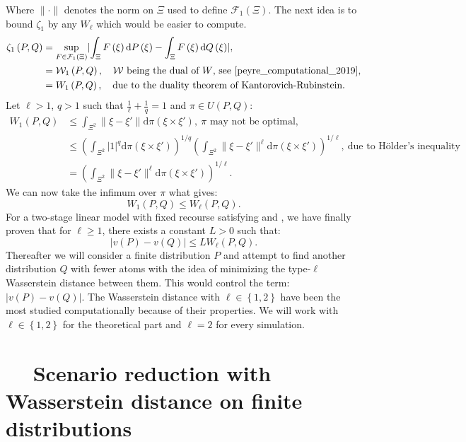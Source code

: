 \documentclass{amsart}
\begin{document}
Where $\lVert \cdot \rVert$ denotes the norm on $\Xi$ used to define $\mathcal{F}_1\left(\Xi\right)$. The next idea is to bound $\zeta_1$ by any $W_\ell$ which would be easier to compute.
\begin{align*}
    \zeta_1\left(P,Q\right)&= \sup_{F\in\mathcal{F}_1\left(\Xi\right)}\lvert \int_\Xi F\left(\xi\right)\text{d}P\left(\xi\right)-\int_\Xi F\left(\xi\right)\text{d}Q\left(\xi\right)\rvert, \\
    &=\mathcal{W}_1\left(P,Q\right), \quad \mathcal{W} \text{ being the dual of } W \text{, see \cite[Chapter 6]{peyre_computational_2019},}\\
    &= W_1\left(P,Q\right), \quad \text{due to the duality theorem of Kantorovich-Rubinstein.}
\end{align*}
Let $\ell >1$, $q>1$ such that $\frac{1}{\ell}+\frac{1}{q}=1$ and $\pi\in U\left(P,Q\right)$:
\begin{align*}
W_1\left(P,Q\right)&\leq \int_{\Xi^2}\lVert \xi-\xi'\rVert \text{d}\pi\left(\xi\times\xi'\right),\: \pi \text{ may not be optimal,} \\ &\leq \left(\int_{\Xi^2} \lvert 1\rvert^{q}\text{d}\pi\left(\xi\times\xi'\right)\right)^{1/q} \left(\int_{\Xi^2}\lVert \xi-\xi'\rVert^\ell\text{d}\pi\left(\xi\times\xi'\right)\right)^{1/\ell}, \: \text{due to Hölder's inequality} \\
&=\left(\int_{\Xi^2}\lVert \xi-\xi'\rVert^\ell\text{d}\pi\left(\xi\times\xi'\right)\right)^{1/\ell}.
\end{align*}
We can now take the infimum over $\pi$ what gives:
$$
W_1\left(P,Q\right)\leq W_\ell\left(P,Q\right).
$$
For a two-stage linear model with fixed recourse satisfying  and , we have finally proven that for $\ell\geq1$, there exists a constant $L>0$ such that:
$$
\lvert v\left(P\right)-v\left(Q\right)\rvert \leq LW_\ell\left(P,Q\right).
$$
Thereafter we will consider a finite distribution $P$ and attempt to find another distribution $Q$ with fewer atoms with the idea of minimizing the type-$\ell$ Wasserstein distance between them. This would control the term: $\lvert v\left(P\right)-v\left(Q\right)\rvert$. The Wasserstein distance with $\ell\in\left\{1,2\right\}$ have been the most studied computationally because of their properties. We will work with $\ell\in\left\{1,2\right\}$ for the theoretical part and $\ell=2$ for every simulation.

\section{$\quad$ Scenario reduction with Wasserstein distance on finite distributions}
\end{document}
